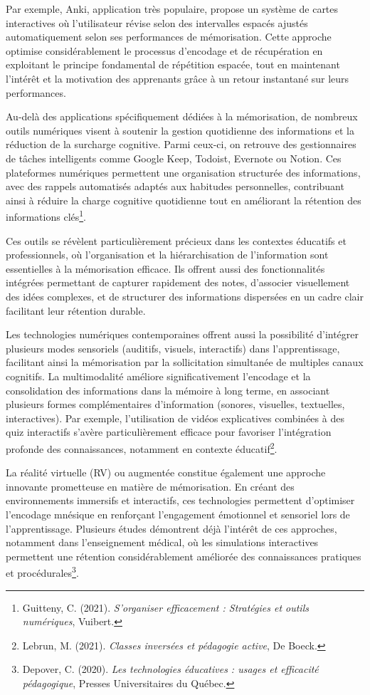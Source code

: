 \documentclass[11pt,a4paper]{report}
\begin{document}
Par exemple, Anki, application très populaire, propose un système de cartes interactives où l’utilisateur révise selon des intervalles espacés ajustés automatiquement selon ses performances de mémorisation. Cette approche optimise considérablement le processus d’encodage et de récupération en exploitant le principe fondamental de répétition espacée, tout en maintenant l'intérêt et la motivation des apprenants grâce à un retour instantané sur leurs performances.

Au-delà des applications spécifiquement dédiées à la mémorisation, de nombreux outils numériques visent à soutenir la gestion quotidienne des informations et la réduction de la surcharge cognitive. Parmi ceux-ci, on retrouve des gestionnaires de tâches intelligents comme Google Keep, Todoist, Evernote ou Notion. Ces plateformes numériques permettent une organisation structurée des informations, avec des rappels automatisés adaptés aux habitudes personnelles, contribuant ainsi à réduire la charge cognitive quotidienne tout en améliorant la rétention des informations clés\footnote{Guitteny, C. (2021). \textit{S'organiser efficacement : Stratégies et outils numériques}, Vuibert.}.

Ces outils se révèlent particulièrement précieux dans les contextes éducatifs et professionnels, où l’organisation et la hiérarchisation de l’information sont essentielles à la mémorisation efficace. Ils offrent aussi des fonctionnalités intégrées permettant de capturer rapidement des notes, d'associer visuellement des idées complexes, et de structurer des informations dispersées en un cadre clair facilitant leur rétention durable.

Les technologies numériques contemporaines offrent aussi la possibilité d’intégrer plusieurs modes sensoriels (auditifs, visuels, interactifs) dans l’apprentissage, facilitant ainsi la mémorisation par la sollicitation simultanée de multiples canaux cognitifs. La multimodalité améliore significativement l’encodage et la consolidation des informations dans la mémoire à long terme, en associant plusieurs formes complémentaires d’information (sonores, visuelles, textuelles, interactives). Par exemple, l'utilisation de vidéos explicatives combinées à des quiz interactifs s’avère particulièrement efficace pour favoriser l’intégration profonde des connaissances, notamment en contexte éducatif\footnote{Lebrun, M. (2021). \textit{Classes inversées et pédagogie active}, De Boeck.}.

La réalité virtuelle (RV) ou augmentée constitue également une approche innovante prometteuse en matière de mémorisation. En créant des environnements immersifs et interactifs, ces technologies permettent d'optimiser l'encodage mnésique en renforçant l'engagement émotionnel et sensoriel lors de l’apprentissage. Plusieurs études démontrent déjà l’intérêt de ces approches, notamment dans l’enseignement médical, où les simulations interactives permettent une rétention considérablement améliorée des connaissances pratiques et procédurales\footnote{Depover, C. (2020). \textit{Les technologies éducatives : usages et efficacité pédagogique}, Presses Universitaires du Québec.}.
\end{document}
